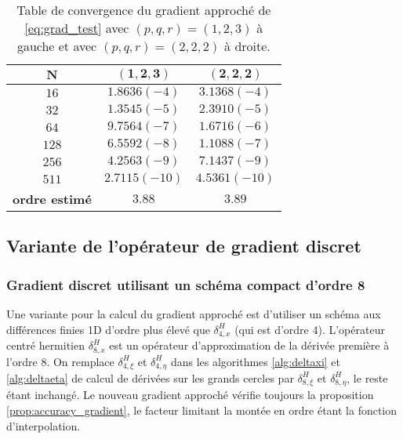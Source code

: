 \begin{table}[htbp]
\begin{center}
\begin{tabular}{|c||c|c|}
\hline
$\mathbf{N}$    & $\mathbf{(1,2,3)}$     & $\mathbf{(2,2,2)}$     \\
\hline
\hline
$16$   & $1.8636 (-4)$ & $3.1368 (-4)$ \\
$32$   & $1.3545 (-5)$ & $2.3910 (-5)$ \\
$64$   & $9.7564 (-7)$ & $1.6716 (-6)$ \\
$128$  & $6.5592 (-8)$ & $1.1088 (-7)$ \\
$256$  & $4.2563 (-9)$ & $7.1437 (-9)$ \\
$511$  & $2.7115(-10)$ & $4.5361(-10)$ \\
\hline
\hline
\textbf{ordre estimé} & $3.88$ & $3.89$ \\
\hline 
\end{tabular}
\end{center}
\caption{Table de convergence du gradient approché de \eqref{eq:grad_test} avec $(p,q,r)=(1,2,3)$ à gauche et avec $(p,q,r)=(2,2,2)$ à droite.}
\label{tab:rate_grad}
\end{table}















\subsection{Variante de l'opérateur de gradient discret}


\subsubsection{Gradient discret utilisant un schéma compact d'ordre 8}

Une variante pour la calcul du gradient approché est d'utiliser un schéma aux différences finies 1D d'ordre plus élevé que $\delta_{4,x}^H$ (qui est d'ordre 4). 
L'opérateur centré hermitien $\delta_{8,x}^H$ est un opérateur d'approximation de la dérivée première à l'ordre $8$.
On remplace $\delta_{4, \xi}^H$ et $\delta_{4, \eta}^H$ dans les algorithmes \ref{alg:deltaxi} et \ref{alg:deltaeta} de calcul de dérivées sur les grands cercles par $\delta_{8, \xi}^H$ et $\delta_{8, \eta}^H$, le reste étant inchangé. Le nouveau gradient approché vérifie toujours la proposition \ref{prop:accuracy_gradient}, le facteur limitant la montée en ordre étant la fonction d'interpolation.

